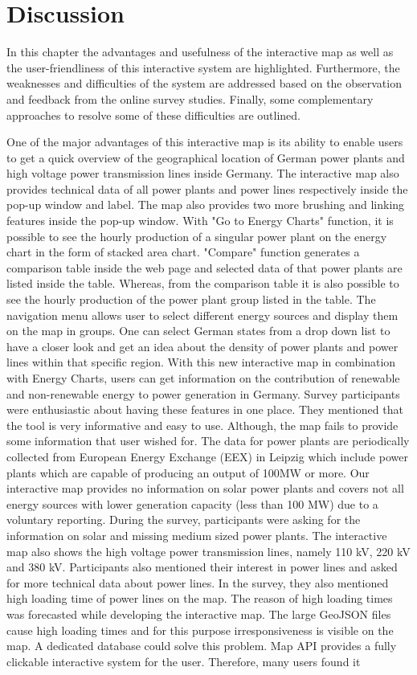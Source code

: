 \chapter{Discussion}
\label{chap:discussion}

In this chapter the advantages and usefulness of the interactive map as well as the user-friendliness of this interactive system are highlighted. Furthermore, the weaknesses and difficulties of the system are addressed based on the observation and feedback from the online survey studies. Finally, some complementary approaches to resolve some of these difficulties are outlined.

One of the major advantages of this interactive map is its ability to enable users to get a quick overview of the geographical location of German power plants and high voltage power transmission lines inside Germany.  The interactive map also provides technical data of all power plants and power lines respectively inside the pop-up window and label. The map also provides two more brushing and linking features inside the pop-up window. With "Go to Energy Charts" function, it is possible to see the hourly production of a singular power plant on the energy chart in the form of stacked area chart. "Compare" function generates a comparison table inside the web page and selected data of that power plants are listed inside the table. Whereas, from the comparison table it is also possible to see the hourly production of the power plant group listed in the table. The navigation menu allows user to select different energy sources and display them on the map in groups. One can select German states from a drop down list to have a closer look and get an idea about the density of power plants and power lines within that specific region. With this new interactive map in combination with Energy Charts, users can get information on the contribution of renewable and non-renewable energy to power generation in Germany. Survey participants were enthusiastic about having these features in one place. They mentioned that the tool is very informative and easy to use. Although, the map fails to provide some information that user wished for. The data for power plants are periodically collected from European Energy Exchange (EEX) in Leipzig which include power plants which are capable of producing an output of 100MW or more. Our interactive map provides no information on solar power plants and covers not all energy sources with lower generation capacity (less than 100 MW) due to a voluntary reporting. During the survey, participants were asking for the information on solar and missing medium sized power plants. The interactive map also shows the high voltage power transmission lines, namely 110 kV, 220 kV and 380 kV. Participants also mentioned their interest in power lines and asked for more technical data about power lines. In the survey, they also mentioned high loading time of power lines on the map. The reason of high loading times was forecasted while developing the interactive map. The large GeoJSON files cause high loading times and for this purpose irresponsiveness is visible on the map. A dedicated database could solve this problem. Map API provides a fully clickable interactive system for the user. Therefore, many users found it 
